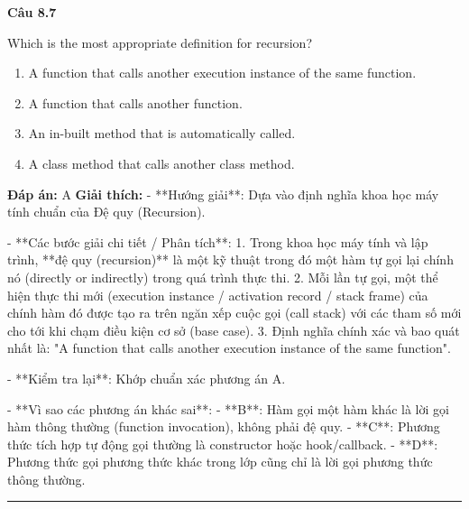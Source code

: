 \documentclass[11pt,a4paper]{article}
\newenvironment{question}[1]{%
  \par\vspace{1em}\noindent\textbf{\large Câu #1}\par\vspace{0.4em}
}{%
  \par\vspace{1em}\hrule\vspace{0.6em}
}
\newenvironment{choices}{%
  \begin{enumerate}[label=\textbf{\Alph*.},leftmargin=2.2em,itemsep=2pt,topsep=3pt]
}{%
  \end{enumerate}
}
\newcommand{\choice}{\item}
\begin{document}
\begin{question}{8.7}
Which is the most appropriate definition for recursion?
\begin{choices}
\choice A function that calls another execution instance of the same function.
\choice A function that calls another function.
\choice An in-built method that is automatically called.
\choice A class method that calls another class method.
\end{choices}
\textbf{Đáp án:} A
\textbf{Giải thích:} - **Hướng giải**:
  Dựa vào định nghĩa khoa học máy tính chuẩn của Đệ quy (Recursion).

- **Các bước giải chi tiết / Phân tích**:
  1. Trong khoa học máy tính và lập trình, **đệ quy (recursion)** là một kỹ thuật trong đó một hàm tự gọi lại chính nó (directly or indirectly) trong quá trình thực thi.
  2. Mỗi lần tự gọi, một thể hiện thực thi mới (execution instance / activation record / stack frame) của chính hàm đó được tạo ra trên ngăn xếp cuộc gọi (call stack) với các tham số mới cho tới khi chạm điều kiện cơ sở (base case).
  3. Định nghĩa chính xác và bao quát nhất là: "A function that calls another execution instance of the same function".

- **Kiểm tra lại**:
  Khớp chuẩn xác phương án A.

- **Vì sao các phương án khác sai**:
  - **B**: Hàm gọi một hàm khác là lời gọi hàm thông thường (function invocation), không phải đệ quy.
  - **C**: Phương thức tích hợp tự động gọi thường là constructor hoặc hook/callback.
  - **D**: Phương thức gọi phương thức khác trong lớp cũng chỉ là lời gọi phương thức thông thường.
\end{question}
\end{document}
